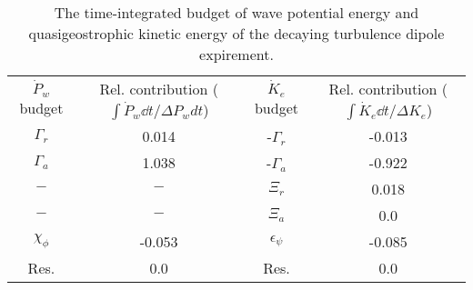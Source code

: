 \begin{table}
\begin{center}
\caption{The time-integrated budget of wave potential energy and quasigeostrophic                kinetic energy of the decaying turbulence dipole expirement. \label{table2}}
\begin{tabular}{cccc}
$\dot{P}_w$ budget & Rel. contribution ($\int\dot{P}_w \dd t/\Delta P_w dt$) & $\dot{K}_e$ budget & Rel. contribution ($\int\dot{K}_e \dd t/\Delta K_e$) \\
$\Gamma_r$ & 0.014 & -$\Gamma_r$ & -0.013 \\
$\Gamma_a$ & 1.038 & -$\Gamma_a$ & -0.922 \\
$-$ & $-$ & $\Xi_r$ & 0.018 \\
$-$ & $-$ & $\Xi_a$ & 0.0 \\
$\chi_\phi$ & -0.053 & $\epsilon_\psi$ & -0.085 \\
Res. & 0.0 & Res. & 0.0 \\
\end{tabular}
\end{center}
\end{table}

